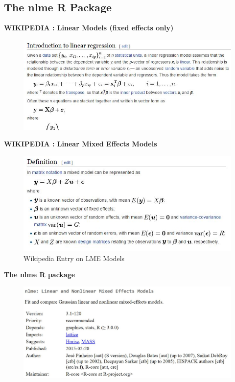 \documentclass[compress]{beamer}        %
\begin{document}
	\subsection{The nlme R Package}
\begin{frame}
\noindent \textbf{WIKIPEDIA :  Linear Models (fixed effects only)}
	\begin{figure}
		
\centering
\includegraphics[width=1.1\linewidth]{images/LinearModelsWikipedia}
\end{figure}

\end{frame}	
					\begin{frame}
\noindent \textbf{WIKIPEDIA :  Linear Mixed Effects Models}
						\begin{figure}
\centering
\includegraphics[width=1.0\linewidth]{images/LME-wiki}
\caption{Wikipedia Entry on LME Models}
\end{figure}

					\end{frame}
				\begin{frame}
					\noindent \textbf{The nlme R package}
					\begin{figure}
						\centering
						\includegraphics[width=1.15\linewidth]{images/CRAN-nlme}
						
					\end{figure}
					
				\end{frame}
\end{document}
